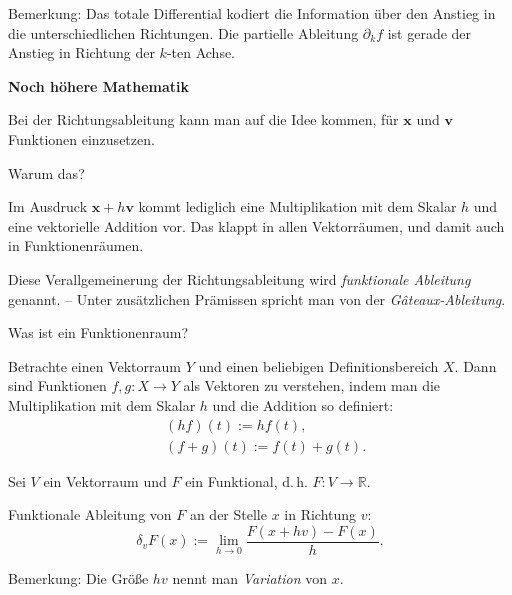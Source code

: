 \documentclass[9pt]{beamer}
\newcommand{\R}{\mathbb R}
\newcommand{\strong}[1]{\textsf{\textbf{#1}}}
\begin{document}
\begin{frame}
\begin{footnotesize}
Bemerkung: Das totale Differential kodiert die Information über den
Anstieg in die unterschiedlichen Richtungen. Die partielle
Ableitung $\partial_k f$ ist gerade der Anstieg in Richtung der
$k$-ten Achse.
\end{footnotesize}
\end{frame}

\begin{frame}
\begin{center}
\strong{Noch höhere Mathematik}
\end{center}
\end{frame}

\begin{frame}
Bei der Richtungsableitung kann man auf die Idee kommen, für
$\mathbf x$ und $\mathbf v$ Funktionen einzusetzen.
\pause

\vspace{0.6em}
Warum das?
\pause

\vspace{0.6em}
Im Ausdruck $\mathbf x+h\mathbf v$ kommt lediglich eine
Multiplikation mit dem Skalar $h$ und eine vektorielle Addition vor.
Das klappt in allen Vektorräumen, und damit auch in Funktionenräumen.
\pause

\vspace{0.8em}
Diese Verallgemeinerung der Richtungsableitung wird
\emph{funktionale Ableitung} genannt. -- Unter zusätzlichen
Prämissen spricht man von der \emph{Gâteaux-Ableitung}.
\end{frame}

\begin{frame}
Was ist ein Funktionenraum?\pause

\vspace{0.8em}
Betrachte einen Vektorraum $Y$
und einen beliebigen Definitionsbereich $X$. Dann sind
Funktionen $f,g\colon X\to Y$ als Vektoren zu verstehen, indem
man die Multiplikation mit dem Skalar $h$ und
die Addition so definiert:
\begin{align*}
& (hf)(t) := hf(t),\\
& (f+g)(t) := f(t)+g(t).
\end{align*}
\end{frame}

\begin{frame}
\begin{Definition}
Sei $V$ ein Vektorraum und $F$ ein Funktional, d.\,h. $F\colon V\to\R$.

\vspace{0.6em}
Funktionale Ableitung von $F$ an der Stelle $x$ in Richtung $v$:
\[\delta_v F(x) := \lim_{h\to 0}\frac{F(x+hv)-F(x)}{h}.\]
\end{Definition}\pause

Bemerkung: Die Größe $hv$ nennt man \emph{Variation} von $x$.
\end{frame}
\end{document}
